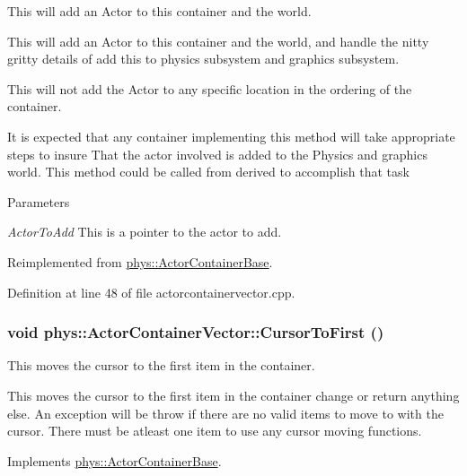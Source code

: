 This will add an Actor to this container and the world. 

This will add an Actor to this container and the world, and handle the nitty gritty details of add this to physics subsystem and graphics subsystem. \par
\par
 This will not add the Actor to any specific location in the ordering of the container. \par
\par
 It is expected that any container implementing this method will take appropriate steps to insure That the actor involved is added to the Physics and graphics world. This method could be called from derived to accomplish that task 
\begin{DoxyParams}{Parameters}
\item[{\em ActorToAdd}]This is a pointer to the actor to add. \end{DoxyParams}


Reimplemented from \hyperlink{classphys_1_1ActorContainerBase_af32c2adf4c0f928604ce05e20b07ef66}{phys::ActorContainerBase}.



Definition at line 48 of file actorcontainervector.cpp.

\hypertarget{classphys_1_1ActorContainerVector_ad9c2eb2a9405dcf687c86745afc9c031}{
\subsubsection[{CursorToFirst}]{\setlength{\rightskip}{0pt plus 5cm}void phys::ActorContainerVector::CursorToFirst ()}}
\label{d3/d64/classphys_1_1ActorContainerVector_ad9c2eb2a9405dcf687c86745afc9c031}


This moves the cursor to the first item in the container. 

This moves the cursor to the first item in the container change or return anything else. An exception will be throw if there are no valid items to move to with the cursor. There must be atleast one item to use any cursor moving functions. 

Implements \hyperlink{classphys_1_1ActorContainerBase_ab1a44758d7c17e70ff2e0f8de47424c3}{phys::ActorContainerBase}.



